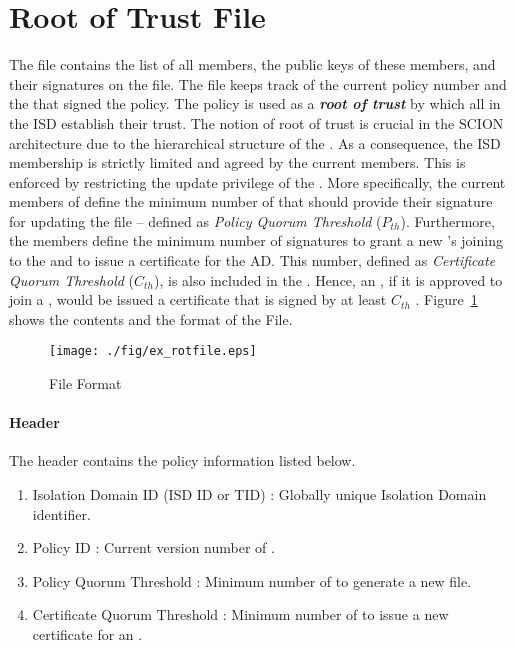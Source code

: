 \section{Root of Trust File} \label{subsec:root-of-trust}
The \RT file contains the list of all \ISDCore members, the public keys of these members, and their signatures on the \RT file. The \RT file keeps track of the current policy number and the \ADs that signed the policy. The policy is used as a {\bf \em root of trust} by which all \ADs in the ISD establish their trust. The notion of root of trust is crucial in the SCION architecture due to the hierarchical structure of the \ISD. As a consequence, the ISD membership is strictly limited and agreed by the current members. This is enforced by restricting the update privilege of the \PF. More specifically, the current members of \ISDC define the minimum number of \ADs that should provide their signature for updating the \RT file -- defined as {\em Policy Quorum Threshold} ($P_{th}$). Furthermore, the \ISDC members define the minimum number of \AD signatures to grant a new \AD's joining to the \ISDC and to issue a certificate for the AD. This number, defined as {\em Certificate Quorum Threshold} ($C_{th}$), is also included in the \PF. Hence, an \AD, if it is approved to join a \ISDC, would be issued a certificate that is signed by at least $C_{th}$ \ISDC \ADs. Figure~\ref{fig:rot-file} shows the contents and the format of the \RT File. 

\begin{figure}[h]
\centering
\texttt{[image: ./fig/ex\_rotfile.eps]}
\caption{\RT File Format}\label{fig:rot-file}
\end{figure}

\paragraph{Header}
The header contains the \ISDC policy information listed below. 

\begin{enumerate}
\item Isolation Domain ID (ISD ID or TID) : Globally unique Isolation Domain identifier.
\item Policy ID : Current version number of \PF.
\item Policy Quorum Threshold : Minimum number of \ISDC \ADs to generate a new \RT file. 
\item Certificate Quorum Threshold : Minimum number of \ISDC \ADs to issue a new certificate for an \AD.
\end{enumerate}

